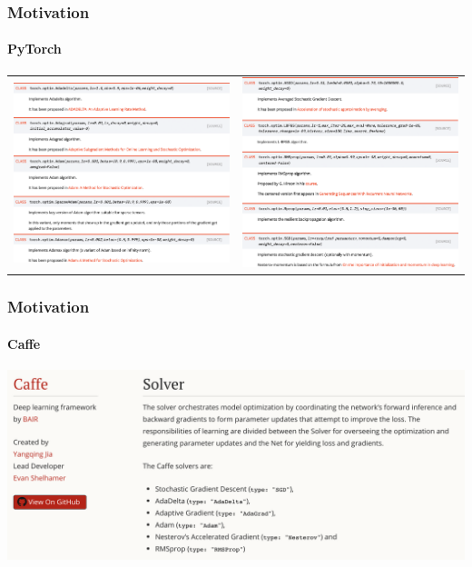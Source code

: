 \documentclass{beamer}
\begin{document}
\begin{frame}
    \frametitle{Motivation}
    \framesubtitle{PyTorch}
    
    \begin{table}
        \centering
        \begin{tabular}{c c}
        \includegraphics[width=0.5\columnwidth]{pytorch-algs-1.png} & \includegraphics[width=0.5\columnwidth]{pytorch-algs-2.png} 
 \\
        \end{tabular}
        \label{tab:pytorch-motivation}
    \end{table}
    
\end{frame}

\begin{frame}
    \frametitle{Motivation}
    \framesubtitle{Caffe}
    
    \includegraphics[width=1\columnwidth]{caffe-algs.png}
    
\end{frame}
\end{document}
